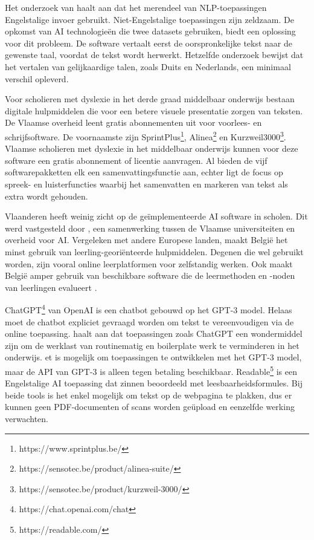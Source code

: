 Het onderzoek van \textcite{Sciforce2020} haalt aan dat het merendeel van NLP-toepassingen Engelstalige invoer gebruikt. Niet-Engelstalige toepassingen zijn zeldzaam. De opkomst van AI technologieën die twee datasets gebruiken, biedt een oplossing voor dit probleem. De software vertaalt eerst de oorspronkelijke tekst naar de gewenste taal, voordat de tekst wordt herwerkt. Hetzelfde onderzoek bewijst dat het vertalen van gelijkaardige talen, zoals Duits en Nederlands, een minimaal verschil opleverd.

Voor scholieren met dyslexie in het derde graad middelbaar onderwijs bestaan digitale hulpmiddelen die voor een betere visuele presentatie zorgen van teksten. De Vlaamse overheid leent gratis abonnementen uit voor voorlees- en schrijfsoftware. De voornaamste zijn SprintPlus\footnote{https://www.sprintplus.be/}, Alinea\footnote{https://sensotec.be/product/alinea-suite/} en Kurzweil3000\footnote{https://sensotec.be/product/kurzweil-3000/}. Vlaamse scholieren met dyslexie in het middelbaar onderwijs kunnen voor deze software een gratis abonnement of licentie aanvragen. Al bieden de vijf softwarepakketten elk een samenvattingsfunctie aan, echter ligt de focus op spreek- en luisterfuncties waarbij het samenvatten en markeren van tekst als extra wordt gehouden.

Vlaanderen heeft weinig zicht op de geïmplementeerde AI software in scholen. Dit werd vastgesteld door \autocite{Martens2021}, een samenwerking tussen de Vlaamse universiteiten en overheid voor AI. Vergeleken met andere Europese landen, maakt België het minst gebruik van leerling-georiënteerde hulpmiddelen. Degenen die wel gebruikt worden, zijn vooral online leerplatformen voor zelfstandig werken. Ook maakt België amper gebruik van beschikbare software die de leermethoden en -noden van leerlingen evalueert \autocite{Martens2021a}. 

ChatGPT\footnote{https://chat.openai.com/chat} van OpenAI is een chatbot gebouwd op het GPT-3 model. Helaas moet de chatbot expliciet gevraagd worden om tekst te vereenvoudigen via de online toepassing. \textcite{Verhoeven2023} haalt aan dat toepassingen zoals ChatGPT een wondermiddel zijn om de werklast van routinematig en boilerplate werk te verminderen in het onderwijs. et is mogelijk om toepassingen te ontwikkelen met het GPT-3 model, maar de API van GPT-3 is alleen tegen betaling beschikbaar. Readable\footnote{https://readable.com/} is een Engelstalige AI toepassing dat zinnen beoordeeld met leesbaarheidsformules. Bij beide tools is het enkel mogelijk om tekst op de webpagina te plakken, dus er kunnen geen PDF-documenten of scans worden geüpload en eenzelfde werking verwachten.

